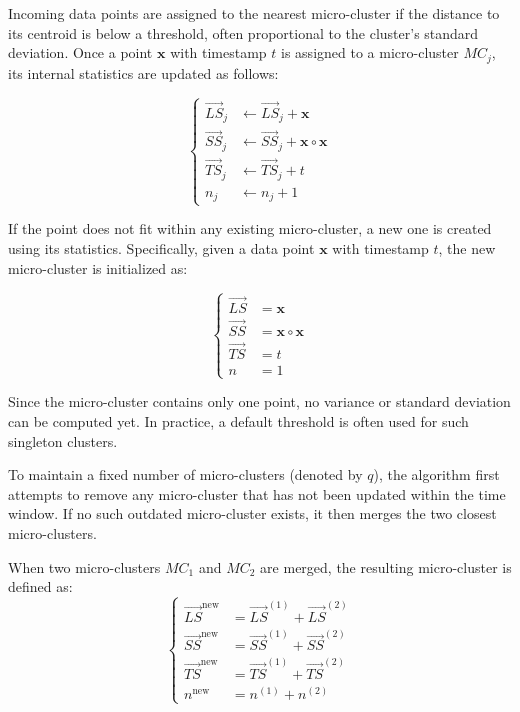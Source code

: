 Incoming data points are assigned to the nearest micro-cluster if the distance
to its centroid is below a threshold, often proportional to the cluster's
standard deviation. Once a point $\mathbf{x}$ with timestamp $t$ is assigned to
a micro-cluster $MC_j$, its internal statistics are updated as follows:

\begin{equation}
    \label{eq:clustream_insert}
    \begin{cases}
        \vec{LS}_j & \leftarrow \vec{LS}_j + \mathbf{x}                  \\
        \vec{SS}_j & \leftarrow \vec{SS}_j + \mathbf{x} \circ \mathbf{x} \\
        \vec{TS}_j & \leftarrow \vec{TS}_j + t                           \\
        n_j        & \leftarrow n_j + 1
    \end{cases}
\end{equation}

If the point does not fit within any existing micro-cluster, a new one is
created using its statistics. Specifically, given a data point $ \mathbf{x} $
with timestamp $ t $, the new micro-cluster is initialized as:

\begin{equation}
    \label{eq:clustream_create}
    \begin{cases}
        \vec{LS} & = \mathbf{x}                  \\
        \vec{SS} & = \mathbf{x} \circ \mathbf{x} \\
        \vec{TS} & = t                           \\
        n        & = 1
    \end{cases}
\end{equation}

Since the micro-cluster contains only one point, no variance or standard
deviation can be computed yet. In practice, a default threshold is often used
for such singleton clusters.

To maintain a fixed number of micro-clusters (denoted by $q$), the algorithm
first attempts to remove any micro-cluster that has not been updated within the
time window. If no such outdated micro-cluster exists, it then merges the two
closest micro-clusters.

When two micro-clusters $MC_1$ and $MC_2$ are merged, the resulting
micro-cluster is defined as:
\begin{equation}
    \label{eq:clustream_merge}
    \begin{cases}
        \vec{LS}^{\text{new}} & = \vec{LS}^{(1)} + \vec{LS}^{(2)} \\
        \vec{SS}^{\text{new}} & = \vec{SS}^{(1)} + \vec{SS}^{(2)} \\
        \vec{TS}^{\text{new}} & = \vec{TS}^{(1)} + \vec{TS}^{(2)} \\
        n^{\text{new}}        & = n^{(1)} + n^{(2)}
    \end{cases}
\end{equation}

